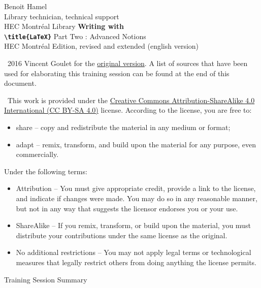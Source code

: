 \scriptsize

\begin{frame}
	Benoit Hamel \\
	Library technician, technical support \\
	HEC Montréal Library
	\vfill
	{
		\Huge\bfseries
		Writing with \\
		\texttt{\textbackslash title\{\textrm{\LaTeX}\}}
	}
	\vfill
	Part Two : Advanced Notions \\
	HEC Montréal Edition, revised and extended (english version)
\end{frame}

\begin{frame}
	\faCopyright\ 2016 Vincent Goulet for the 
	\href{https://ctan.org/pkg/formation-latex-ul}{original version}. A list of sources that have been used
	for elaborating this training session can be found at the end of this document.
	
	\faCreativeCommons\ This work is provided under the  
	\href{http://creativecommons.org/licenses/by-sa/4.0/deed.en}{%
	Creative Commons Attribution-ShareAlike 4.0 International (CC BY-SA 4.0)} license. 
	According to the license, you are free to:
	
	\begin{itemize}
		\item share -- copy and redistribute the material in any medium or format;
		\item adapt -- remix, transform, and build upon the material
		for any purpose, even commercially.
	\end{itemize}

	Under the following terms:
	
	\begin{itemize}
		\item Attribution -- You must give appropriate credit, provide a link to the license, and indicate if changes were made. You may do so in any reasonable manner, but not in any way that suggests the licensor endorses you or your use.
		\item ShareAlike -- If you remix, transform, or build upon the material, you must distribute your contributions under the same license as the original.
		\item No additional restrictions -- You may not apply legal terms or technological measures that legally restrict others from doing anything the license permits.
	\end{itemize}
\end{frame}

\begin{frame}{Training Session Summary}
	\tableofcontents
\end{frame}